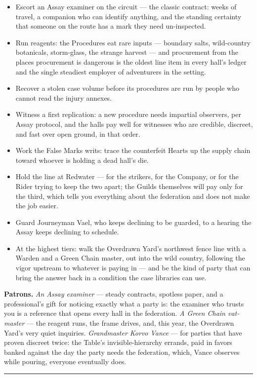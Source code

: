 \begin{itemize}
    \item Escort an Assay examiner on the circuit --- the classic contract: weeks of travel, a companion who can identify anything, and the standing certainty that someone on the route has a mark they need un-inspected.
    \item Run reagents: the Procedures eat rare inputs --- boundary salts, wild-country botanicals, storm-glass, the strange harvest --- and procurement from the places procurement is dangerous is the oldest line item in every hall's ledger and the single steadiest employer of adventurers in the setting.
    \item Recover a stolen case volume before its procedures are run by people who cannot read the injury annexes.
    \item Witness a first replication: a new procedure needs impartial observers, per Assay protocol, and the halls pay well for witnesses who are credible, discreet, and fast over open ground, in that order.
    \item Work the False Marks writs: trace the counterfeit Hearts up the supply chain toward whoever is holding a dead hall's die.
    \item Hold the line at Redwater --- for the strikers, for the Company, or for the Rider trying to keep the two apart; the Guilds themselves will pay only for the third, which tells you everything about the federation and does not make the job easier.
    \item Guard Journeyman Vael, who keeps declining to be guarded, to a hearing the Assay keeps declining to schedule.
    \item At the highest tiers: walk the Overdrawn Yard's northwest fence line with a Warden and a Green Chain master, out into the wild country, following the vigor upstream to whatever is paying in --- and be the kind of party that can bring the answer back in a condition the case libraries can use.
\end{itemize}

\textbf{Patrons.} \textit{An Assay examiner} --- steady contracts, spotless paper, and a professional's gift for noticing exactly what a party is: the examiner who trusts you is a reference that opens every hall in the federation. \textit{A Green Chain vat-master} --- the reagent runs, the frame drives, and, this year, the Overdrawn Yard's very quiet inquiries. \textit{Grandmaster Korvo Vance} --- for parties that have proven discreet twice: the Table's invisible-hierarchy errands, paid in favors banked against the day the party needs the federation, which, Vance observes while pouring, everyone eventually does.

\medskip\hrule\medskip
